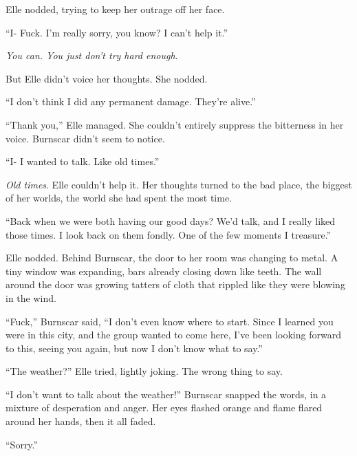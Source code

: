 Elle nodded, trying to keep her outrage off her face.



``I- Fuck.  I'm really sorry, you know?  I can't help it.''



\emph{You can.  You just don't try hard enough}.



But Elle didn't voice her thoughts.  She nodded.



``I don't think I did any permanent damage.  They're alive.''



``Thank you,'' Elle managed.  She couldn't entirely suppress the bitterness in her voice.  Burnscar didn't seem to notice.



``I- I wanted to talk.  Like old times.''



\emph{Old times}.  Elle couldn't help it.  Her thoughts turned to the bad place, the biggest of her worlds, the world she had spent the most time.



``Back when we were both having our good days?  We'd talk, and I really liked those times.  I look back on them fondly.  One of the few moments I treasure.''



Elle nodded.  Behind Burnscar, the door to her room was changing to metal.  A tiny window was expanding, bars already closing down like teeth.  The wall around the door was growing tatters of cloth that rippled like they were blowing in the wind.



``Fuck,'' Burnscar said, ``I don't even know where to start.  Since I learned you were in this city, and the group wanted to come here, I've been looking forward to this, seeing you again, but now I don't know what to say.''



``The weather?'' Elle tried, lightly joking. The wrong thing to say.



``I don't want to talk about the weather!'' Burnscar snapped the words, in a mixture of desperation and anger.  Her eyes flashed orange and flame flared around her hands, then it all faded.



``Sorry.''



